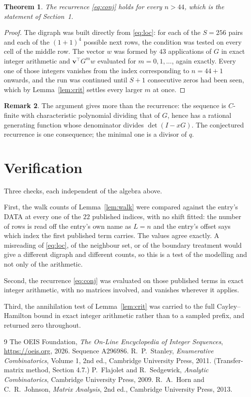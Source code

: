 \documentclass[11pt,a4paper]{article}
\theoremstyle{plain}
\newtheorem{theorem}{Theorem}
\theoremstyle{definition}
\newtheorem{remark}[theorem]{Remark}
\begin{document}
\begin{theorem}
The recurrence \eqref{eq:conj} holds for every $n>44$, which is the statement of
Section~1.
\end{theorem}

\begin{proof}
The digraph was built directly from \eqref{eq:loc}: for each of the $S=256$ pairs and each
of the $(1+1)^{4}$ possible next rows, the condition was tested on every cell of
the middle row. The vector $w$ was formed by $43$ applications of $G$ in exact integer
arithmetic and $\mathbf{v}^{\!\top}G^{m}w$ evaluated for $m=0,1,\dots$, again exactly.
Every one of those integers vanishes from the index corresponding to $n=44+1$ onwards,
and the run was continued until $S+1$ consecutive zeros had been seen, which by
Lemma~\ref{lem:crit} settles every larger $m$ at once.
\end{proof}

\begin{remark}
The argument gives more than the recurrence: the sequence is $C$-finite with characteristic
polynomial dividing that of $G$, hence has a rational generating function whose denominator
divides $\det(I-xG)$. The conjectured recurrence is one consequence; the minimal one is a
divisor of $q$.
\end{remark}

\section{Verification}

Three checks, each independent of the algebra above.

First, the walk counts of Lemma~\ref{lem:walk} were compared against the entry's DATA at
every one of the $22$ published indices, with no shift fitted: the number of rows is
read off the entry's own name as $L=n$ and the entry's offset says which index the first
published term carries. The values agree exactly. A misreading of \eqref{eq:loc}, of the
neighbour set, or of the boundary treatment would give a different digraph and different
counts, so this is a test of the modelling and not only of the arithmetic.

Second, the recurrence \eqref{eq:conj} was evaluated on those published terms in exact
integer arithmetic, with no matrices involved, and vanishes wherever it applies.

Third, the annihilation test of Lemma~\ref{lem:crit} was carried to the full
Cayley--Hamilton bound in exact integer arithmetic rather than to a sampled prefix, and
returned zero throughout.

\begin{thebibliography}{9}
 The OEIS Foundation, \emph{The On-Line Encyclopedia of Integer
Sequences}, \url{https://oeis.org}, 2026. Sequence A296986.
 R.~P.~Stanley, \emph{Enumerative Combinatorics}, Volume 1, 2nd ed.,
Cambridge University Press, 2011. (Transfer-matrix method, Section 4.7.)
 P.~Flajolet and R.~Sedgewick, \emph{Analytic Combinatorics}, Cambridge
University Press, 2009.
 R.~A.~Horn and C.~R.~Johnson, \emph{Matrix Analysis}, 2nd ed., Cambridge
University Press, 2013.
\end{thebibliography}
\end{document}
